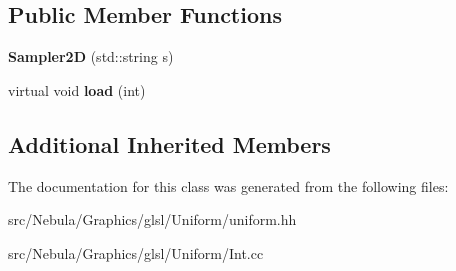 \subsection*{Public Member Functions}
\begin{DoxyCompactItemize}
\item 
\hypertarget{classNeb_1_1glsl_1_1Uniform_1_1Scalar_1_1Sampler2D_a91f35bdd1915418833da9db087bf8689}{{\bfseries Sampler2\-D} (std\-::string s)}\label{classNeb_1_1glsl_1_1Uniform_1_1Scalar_1_1Sampler2D_a91f35bdd1915418833da9db087bf8689}

\item 
\hypertarget{classNeb_1_1glsl_1_1Uniform_1_1Scalar_1_1Sampler2D_ac3fc3a3d42b754e6d6a7477e8605a30d}{virtual void {\bfseries load} (int)}\label{classNeb_1_1glsl_1_1Uniform_1_1Scalar_1_1Sampler2D_ac3fc3a3d42b754e6d6a7477e8605a30d}

\end{DoxyCompactItemize}
\subsection*{Additional Inherited Members}


The documentation for this class was generated from the following files\-:\begin{DoxyCompactItemize}
\item 
src/\-Nebula/\-Graphics/glsl/\-Uniform/uniform.\-hh\item 
src/\-Nebula/\-Graphics/glsl/\-Uniform/Int.\-cc\end{DoxyCompactItemize}
